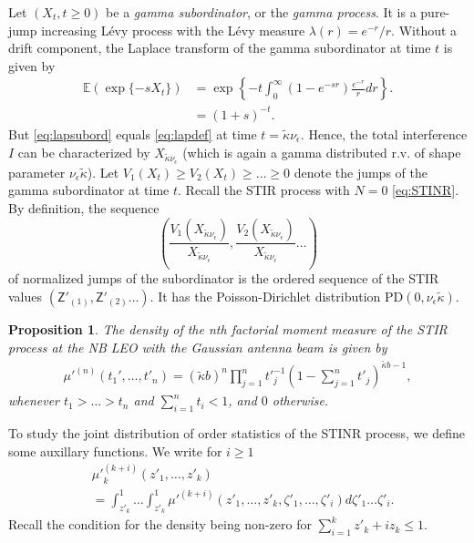 \documentclass[lettersize,journal]{IEEEtran}
\newtheorem{prop}[theorem]{Proposition}
\begin{document}
Let $(X_{t}, t \geq 0)$ be a \textit{gamma subordinator}, or the \textit{gamma process}. It is a pure-jump increasing Lévy process with the Lévy measure $\lambda(r) = e^{- r}/r$. Without a drift component, the Laplace transform of the gamma subordinator at time $t$ is given by
\begin{align}
  \label{eq:lapsubord}
  \mathbb{E}(\exp\{-s X_{t}\}) &= \exp\left\{-{t} \int_0^{\infty}(1-e^{-s r})\frac{e^{-r}}{r} dr \right\}. \nonumber \\
  &=(1+s)^{-t}.
\end{align}
But \eqref{eq:lapsubord} equals \eqref{eq:lapdef} at time $t=\tilde{\kappa}\nu_{\epsilon} $. Hence, the total interference $I$ can be characterized by $X_{\tilde{\kappa} \nu_{\epsilon}}$ (which is again a gamma distributed r.v. of shape parameter $\nu_{\epsilon}\tilde{\kappa}$). Let $V_1(X_{t}) \geq V_2(X_{t})\geq \dots \geq 0 $ denote the jumps of the gamma subordinator at time $t$. Recall the STIR process with $N=0$ \eqref{eq:STINR}. By definition, the sequence
\begin{equation}
  \label{eq:relativesequence}
  \left(\frac{V_1(X_{\tilde{\kappa}\nu_{\epsilon}})}{X_{\tilde{\kappa}\nu_{\epsilon}}},\frac{V_2(X_{\tilde{\kappa}\nu_{\epsilon}})}{X_{\tilde{\kappa}\nu_{\epsilon}}} \dots \right)
\end{equation}
of normalized jumps of the subordinator is the ordered sequence of the STIR values $(\mathsf{Z}'_{(1)},\mathsf{Z}'_{(2)} \dots)$. It has the Poisson-Dirichlet distribution PD$(0, \nu_{\epsilon} \tilde{\kappa})$. 




\begin{prop}
  The density of the n\textit{th} factorial moment measure of the STIR process at the NB LEO with the Gaussian antenna beam is given by
  \begin{align}
    \label{eq:factorialmoment}
    \mu'^{(n)}(t_1',\dots,t'_n) = (\tilde{\kappa}b)^n\prod_{j=1}^n{t'}_{j}^{-1}\left(1- \sum_{j=1}^nt'_j \right)^{\tilde{\kappa}b-1},       
  \end{align}
  whenever $t_1>\dots >t_n$ and $\sum_{i=1}^n t_i <1$, and $0$ otherwise.
\end{prop}
To study the joint distribution of order statistics of the STINR process, we define some auxillary functions. We write for $i\geq 1$
\begin{align}
  \label{eq:auxillary}
  &{\mu'}_k^{(k+i)}(z'_1,\dots,z'_k) \nonumber \\
  &= \int_{z'_k}^1 \dots \int_{z'_k}^1 {\mu'}^{(k+i)}(z'_1,\dots,z'_k,\zeta'_1,\dots,\zeta'_i) d\zeta'_1 \dots \zeta'_i.
\end{align}
Recall the condition for the density being non-zero for $\sum_{i=1}^kz'_k+iz_k \leq 1 $.
\end{document}
